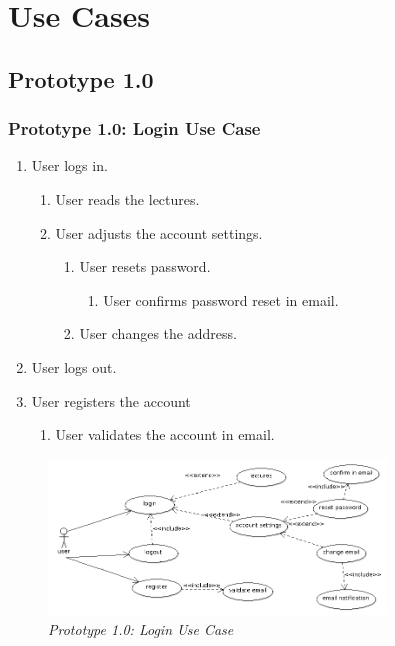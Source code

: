 \documentclass[12pt,twoside,a4paper]{report}
\begin{document}
\section{Use Cases}\label{3.5}

\subsection{Prototype 1.0}\label{3.5.1}

\subsubsection{Prototype 1.0: Login Use Case}\label{3.5.1.1}

\begin{enumerate}\itemsep1pt \parskip0pt 
\item User logs in.
    \begin{enumerate}\itemsep1pt \parskip0pt 
    \item User reads the lectures.
    \item User adjusts the account settings.
     	\begin{enumerate}\itemsep1pt \parskip0pt 
     	\item User resets password.
     		\begin{enumerate}\itemsep1pt \parskip0pt 
     		\item User confirms password reset in email.
     		\end{enumerate}
     	\item User changes the address.
     	\end{enumerate}
   \end{enumerate}
\item User logs out.
\item User registers the account
   	\begin{enumerate}\itemsep1pt \parskip0pt 
    \item User validates the account in email.
   	\end{enumerate}
\end{enumerate}

\begin{figure}[!ht]
	\centering
		\includegraphics[width=0.8\textwidth, totalheight=6cm]{login_use_case}
	\caption{\textit{Prototype 1.0: Login Use Case}}
	\label{f3.5.1.1}
\end{figure}
\end{document}
